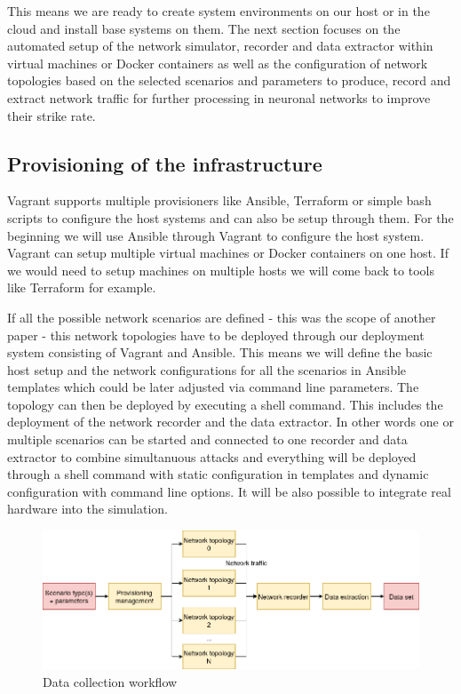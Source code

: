 \documentclass[conference]{IEEEtran}
\begin{document}
This means we are ready to create system environments on our host or in the cloud and install base systems on them. The next section focuses on the automated setup of the network simulator, recorder and data extractor within virtual machines or Docker containers as well as the configuration of network topologies based on the selected scenarios and parameters to produce, record and extract network traffic for further processing in neuronal networks to improve their strike rate.

\subsection{Provisioning of the infrastructure}

Vagrant supports multiple provisioners like Ansible, Terraform or simple bash scripts to configure the host systems and can also be setup through them. For the beginning we will use Ansible through Vagrant to configure the host system. Vagrant can setup multiple virtual machines or Docker containers on one host. If we would need to setup machines on multiple hosts we will come back to tools like Terraform for example. \cite{b9}

If all the possible network scenarios are defined - this was the scope of another paper - this network topologies have to be deployed through our deployment system consisting of Vagrant and Ansible. This means we will define the basic host setup and the network configurations for all the scenarios in Ansible templates which could be later adjusted via command line parameters. The topology can then be deployed by executing a shell command. This includes the deployment of the network recorder and the data extractor. In other words one or multiple scenarios can be started and connected to one recorder and data extractor to combine simultanuous attacks and everything will be deployed through a shell command with static configuration in templates and dynamic configuration with command line options. It will be also possible to integrate real hardware into the simulation.

\begin{figure}[htbp]
\centerline{\includegraphics[scale=0.28]{design_flow.png}}
\caption{Data collection workflow}
\label{design-flow}
\end{figure}
\end{document}
